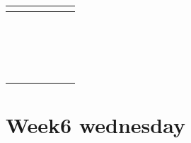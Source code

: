 \documentclass[12pt, oneside]{article}
\begin{document}
\begin{tabular}{|c|c|c|c|c|c|c|}
\hline
\multicolumn{7}{|c|}{\phantom{A}}\\
\hline
\phantom{AA} & \phantom{AA}& \phantom{AA}& \phantom{AA}& \phantom{AA}& \phantom{AA}& \phantom{AA} \\
\hline
\multicolumn{7}{|c|}{\phantom{A}}\\
\hline
\phantom{AA} & \phantom{AA}& \phantom{AA}& \phantom{AA}& \phantom{AA}& \phantom{AA}& \phantom{AA} \\
\hline
\multicolumn{7}{|c|}{\phantom{A}}\\
\hline
\phantom{AA} & \phantom{AA}& \phantom{AA}& \phantom{AA}& \phantom{AA}& \phantom{AA}& \phantom{AA} \\
\hline
\multicolumn{7}{|c|}{\phantom{A}}\\
\hline
\phantom{AA} & \phantom{AA}& \phantom{AA}& \phantom{AA}& \phantom{AA}& \phantom{AA}& \phantom{AA} \\
\hline
\multicolumn{7}{|c|}{\phantom{A}}\\
\hline
\phantom{AA} & \phantom{AA}& \phantom{AA}& \phantom{AA}& \phantom{AA}& \phantom{AA}& \phantom{AA} \\
\hline
\multicolumn{7}{|c|}{\phantom{A}}\\
\hline
\phantom{AA} & \phantom{AA}& \phantom{AA}& \phantom{AA}& \phantom{AA}& \phantom{AA}& \phantom{AA} \\
\hline
\multicolumn{7}{|c|}{\phantom{A}}\\
\hline
\phantom{AA} & \phantom{AA}& \phantom{AA}& \phantom{AA}& \phantom{AA}& \phantom{AA}& \phantom{AA} \\
\hline
\multicolumn{7}{|c|}{\phantom{A}}\\
\hline
\phantom{AA} & \phantom{AA}& \phantom{AA}& \phantom{AA}& \phantom{AA}& \phantom{AA}& \phantom{AA} \\
\hline
\multicolumn{7}{|c|}{\phantom{A}}\\
\hline
\phantom{AA} & \phantom{AA}& \phantom{AA}& \phantom{AA}& \phantom{AA}& \phantom{AA}& \phantom{AA} \\
\hline
\multicolumn{7}{|c|}{\phantom{A}}\\
\hline
\phantom{AA} & \phantom{AA}& \phantom{AA}& \phantom{AA}& \phantom{AA}& \phantom{AA}& \phantom{AA} \\
\hline
\end{tabular}

 \vfill
\section*{Week6 wednesday}
\end{document}
